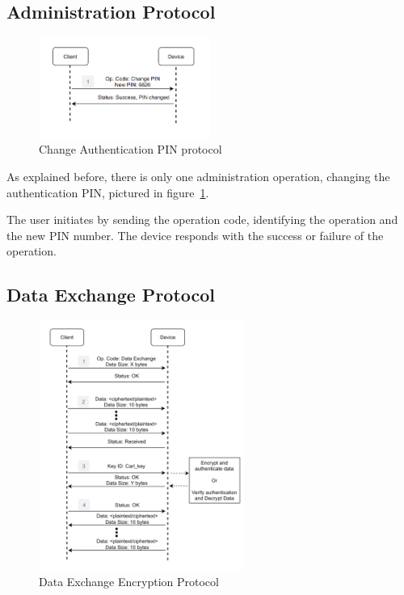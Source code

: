 \subsection{Administration Protocol}\label{chap:solution:protocol:admin}
\begin{figure}[h]
	\centering
	\includegraphics[width=0.5\textwidth]{./Images/change-PIN.png}
	\caption{Change Authentication PIN protocol}
	\label{fig:protocol:change-PIN}
\end{figure}

As explained before, there is only one administration operation, changing the authentication \ac{PIN}, pictured in figure~\ref{fig:protocol:change-PIN}.

The user initiates by sending the operation code, identifying the operation and the new \ac{PIN} number. The device responds with the success or failure of the operation.

\subsection{Data Exchange Protocol}\label{chap:solution:protocol:data}

\begin{figure}[h]
	\centering
	\includegraphics[width=0.6\textwidth]{./Images/data-exchange.png}
	\caption{Data Exchange Encryption Protocol}
	\label{fig:protocol:data-exchange}
\end{figure}

